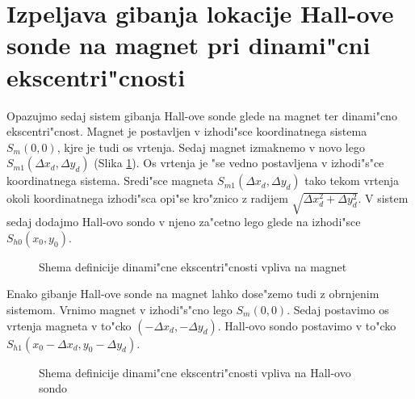 \section{Izpeljava gibanja lokacije Hall-ove sonde na magnet pri dinami"cni ekscentri"cnosti}

Opazujmo sedaj sistem gibanja Hall-ove sonde glede na magnet ter dinami"cno ekscentri"cnost. Magnet je
 postavljen v izhodi"sce koordinatnega sistema $S_m(0,0)$, kjre je tudi os vrtenja. Sedaj magnet izmaknemo v novo lego $S_{m1}(\Delta
  x_d,\Delta y_d)$ (Slika \ref{fig:def_din_eks}). Os vrtenja je "se vedno postavljena v izhodi"s"ce
   koordinatnega sistema. Sredi"sce magneta $S_{m1}(\Delta x_d,\Delta y_d)$ tako tekom vrtenja okoli
    koordinatnega izhodi"sca opi"se kro"znico z radijem $\sqrt{\Delta x_d^2+\Delta y_d^2}$. V sistem sedaj
     dodajmo Hall-ovo sondo v njeno za"cetno lego glede na izhodi"sce $S_{h0}(x_0,y_0)$.




\begin{figure}[h!]
	\centering
	\caption{Shema definicije dinami"cne ekscentri"cnosti vpliva na magnet}
	\label{fig:def_din_eks}
\end{figure}




Enako gibanje Hall-ove sonde na magnet lahko dose"zemo tudi z obrnjenim sistemom. Vrnimo magnet v izhodi"s"cno lego $S_m(0,0)$. Sedaj postavimo os vrtenja magneta v to"cko $(-\Delta x_d,-\Delta y_d)$. Hall-ovo sondo postavimo v to"cko $S_{h1}(x_0-\Delta x_d,y_0 - \Delta y_d).$



\begin{figure}[h!]
	\centering
	\caption{Shema definicije dinami"cne ekscentri"cnosti vpliva na Hall-ovo sondo}
	\label{fig:def_din_eks_na_stator}
\end{figure}

